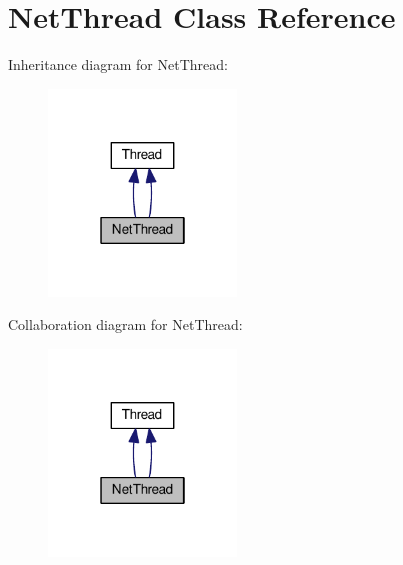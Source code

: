 \hypertarget{class_net_thread}{}\section{Net\+Thread Class Reference}
\label{class_net_thread}


Inheritance diagram for Net\+Thread\+:\nopagebreak
\begin{figure}[H]
\begin{center}
\leavevmode
\includegraphics[width=142pt]{class_net_thread__inherit__graph}
\end{center}
\end{figure}


Collaboration diagram for Net\+Thread\+:\nopagebreak
\begin{figure}[H]
\begin{center}
\leavevmode
\includegraphics[width=142pt]{class_net_thread__coll__graph}
\end{center}
\end{figure}
